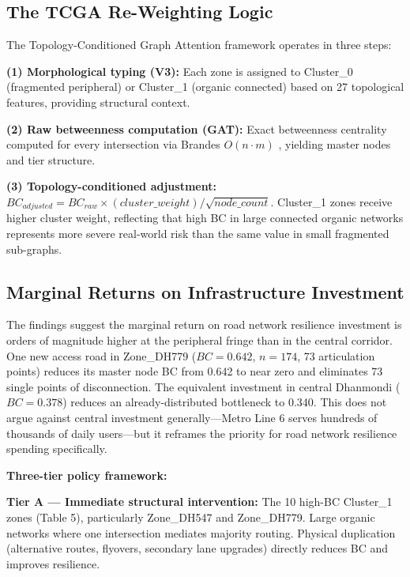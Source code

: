 \documentclass[sigconf, nonacm]{acmart}
\begin{document}
\subsection{The TCGA Re-Weighting Logic}

The Topology-Conditioned Graph Attention framework operates in three steps:

\textbf{(1) Morphological typing (V3):} Each zone is assigned to Cluster\_0 (fragmented peripheral) or Cluster\_1 (organic connected) based on 27 topological features, providing structural context.

\textbf{(2) Raw betweenness computation (GAT):} Exact betweenness centrality computed for every intersection via Brandes $O(n \cdot m)$ \cite{brandes2001}, yielding master nodes and tier structure.

\textbf{(3) Topology-conditioned adjustment:} $BC_{adjusted} = BC_{raw} \times (cluster\_weight) / \sqrt{node\_count}$. Cluster\_1 zones receive higher cluster weight, reflecting that high BC in large connected organic networks represents more severe real-world risk than the same value in small fragmented sub-graphs.

\subsection{Marginal Returns on Infrastructure Investment}

The findings suggest the marginal return on road network resilience investment is orders of magnitude higher at the peripheral fringe than in the central corridor. One new access road in Zone\_DH779 ($BC = 0.642$, $n = 174$, 73 articulation points) reduces its master node BC from 0.642 to near zero and eliminates 73 single points of disconnection. The equivalent investment in central Dhanmondi ($BC = 0.378$) reduces an already-distributed bottleneck to 0.340. This does not argue against central investment generally—Metro Line 6 serves hundreds of thousands of daily users—but it reframes the priority for road network resilience spending specifically.

\textbf{Three-tier policy framework:}

\textbf{Tier A — Immediate structural intervention:} The 10 high-BC Cluster\_1 zones (Table 5), particularly Zone\_DH547 and Zone\_DH779. Large organic networks where one intersection mediates majority routing. Physical duplication (alternative routes, flyovers, secondary lane upgrades) directly reduces BC and improves resilience.
\end{document}
